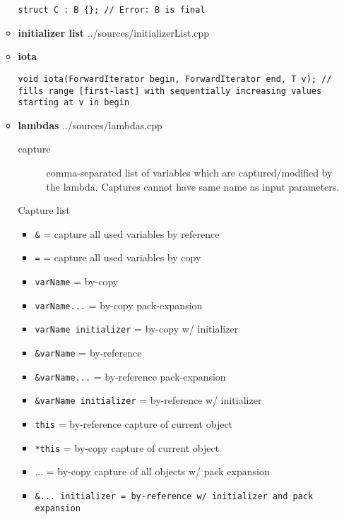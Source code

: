 \documentclass{article}
\begin{document}
\begin{itemize}
\begin{itemize}
\begin{lstlisting}[style=cpp]
struct C : B {}; // Error: B is final
         \end{lstlisting}
		      \item \textbf{initializer list}
		             {../sources/initializerList.cpp}
		      \item \textbf{iota}
		            \begin{lstlisting}[style=cpp]
void iota(ForwardIterator begin, ForwardIterator end, T v); // fills range [first-last] with sequentially increasing values starting at v in begin
         \end{lstlisting}
		      \item \textbf{lambdas}
		             {../sources/lambdas.cpp}
		            \begin{description}
			            \item[capture]
			                  comma-separated list of variables which are captured/modified by the lambda. Captures cannot have same name as input parameters.
		            \end{description}
		            Capture list
		            \begin{itemize}
			            \item \verb!&! = capture all used variables by reference
			            \item \verb!=! = capture all used variables by copy
			            \item \verb!varName! = by-copy
			            \item \verb!varName...! = by-copy pack-expansion
			            \item \verb!varName initializer! = by-copy  w/ initializer
			            \item \verb!&varName! = by-reference
			            \item \verb!&varName...! = by-reference pack-expansion
			            \item \verb!&varName initializer! = by-reference w/ initializer
			            \item \verb!this! = by-reference capture of current object
			            \item \verb!*this! = by-copy capture of current object
			            \item ... = by-copy capture of all objects w/ pack expansion
			            \item \verb!&... initializer = by-reference w/ initializer and pack expansion!
		            \end{itemize}

\end{itemize}
\end{itemize}
\end{document}
